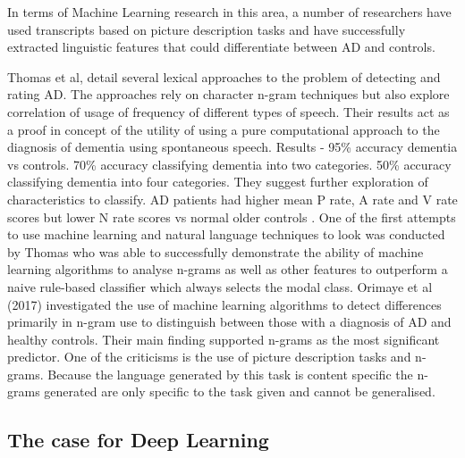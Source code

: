 \documentclass[10pt, letterpaper, twoside, openany]{book}
\begin{document}
In terms of Machine Learning research in this area, a number of researchers have used transcripts based on picture description tasks \cite{Zimmerer2016, Orimaye2017, Mueller2018a, Fraser2015} and have successfully extracted linguistic features that could differentiate between AD and controls.
\par
Thomas et al, detail several lexical approaches to the problem of detecting and rating AD. The approaches rely on character n-gram techniques but also explore correlation of usage of frequency of different types of speech. Their results act as a proof in concept of the utility of using a pure computational approach to the diagnosis of dementia using spontaneous speech. Results - 95\% accuracy dementia vs controls. 70\% accuracy classifying dementia into two categories. 50\% accuracy classifying dementia into four categories. They suggest further exploration of characteristics to classify.
AD patients had higher mean P rate, A rate and V rate scores but lower N rate scores vs normal older controls \cite{Bucks2000}.
One of the first attempts to use machine learning and natural language techniques to look was conducted by Thomas \cite{Thomas2005} who was able to successfully demonstrate the ability of machine learning algorithms to analyse n-grams as well as other features to outperform a naive rule-based classifier which always selects the modal class. Orimaye et al (2017) \cite{Orimaye2017} investigated the use of machine learning algorithms to detect differences primarily in n-gram use to distinguish between those with a diagnosis of AD and healthy controls. Their main finding supported n-grams as the most significant predictor. One of the criticisms is the use of picture description tasks and n-grams. Because the language generated by this task is content specific the n-grams generated are only specific to the task given and cannot be generalised.
\subsection{The case for Deep Learning}

\end{document}
